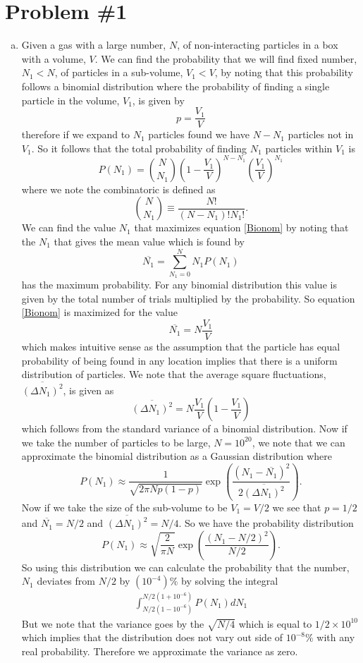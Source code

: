 \documentclass[11pt]{article}
\numberwithin{equation}{section}
\begin{document}


\section{Problem \#1}
\begin{enumerate}[(a)]
\item Given a gas with a large number, $N$, of non-interacting particles in a box with a 
volume, $V$. We can find the probability that we will find fixed number, $N_1<N$, of particles
in a sub-volume, $V_1<V$, by noting that this probability follows a binomial distribution 
where the probability of finding a single particle in the volume, $V_1$, is given by 
$$p = \frac{V_1}{V}$$
therefore if we expand to $N_1$ particles found we have $N-N_1$ particles not in $V_1$. So it
follows that the total probability of finding $N_1$ particles within $V_1$ is
\begin{equation}
P(N_1) = {{N}\choose{N_1}}\left(1-\frac{V_1}{V}\right)^{N-N_1}\left(\frac{V_1}{V}\right)^{N_1}
\label{Bionom}
\end{equation}
where we note the combinatoric is defined as
$${{N}\choose{N_1}} \equiv \frac{N!}{(N-N_1)!N_1!}.$$
We can find the value $N_1$ that maximizes equation \ref{Bionom} by noting that the $N_1$ 
that gives the mean value which is found by
$$\overline{N_1} = \sum_{N_1=0}^{N}N_1P(N_1)$$
has the maximum probability. For any binomial distribution this value is given by the total 
number of trials multiplied by the probability. So equation \ref{Bionom} is maximized for the
value
$$\overline{N_1} = N\frac{V_1}{V}$$
which makes intuitive sense as the assumption that the particle has equal probability of being
found in any location implies that there is a uniform distribution of particles. We note that
the average square fluctuations, $\overline{(\Delta{N_1})^2}$, is given as
$$\overline{(\Delta{N_1})^2} = N\frac{V_1}{V}\left(1-\frac{V_1}{V}\right)$$
which follows from the standard variance of a binomial distribution. Now if we take the 
number of particles to be large, $N=10^{20}$, we note that we can approximate the 
binomial distribution as a Gaussian distribution where
$$P(N_1) \approx \frac{1}{\sqrt{2\pi{N}p(1-p)}}\exp\left(\frac{(N_1-\overline{N_1})^2}{2\overline{(\Delta{N_1})^2}}\right).$$
Now if we take the size of the sub-volume to be $V_1 = V/2$ we see that $p=1/2$ and 
$\overline{N_1} = N/2$ and $\overline{(\Delta{N_1})^2} = N/4$. So we have the probability 
distribution
$$P(N_1) \approx \sqrt{\frac{2}{\pi{N}}}\exp\left(\frac{(N_1-N/2)^2}{N/2}\right).$$
So using this distribution we can calculate the probability that the number, $N_1$ deviates 
from $N/2$ by $(10^{-4})\%$ by solving the integral
\begin{align*}
\int_{N/2(1-10^{-6})}^{N/2(1+10^{-6})}P(N_1)dN_1
\end{align*}
But we note that the variance goes by the $\sqrt{N/4}$ which is equal to $1/2\times10^{10}$ 
which implies that the distribution does not vary out side of $10^{-8}\%$ with any real 
probability. Therefore we approximate the variance as zero.


\end{enumerate}
\end{document}
